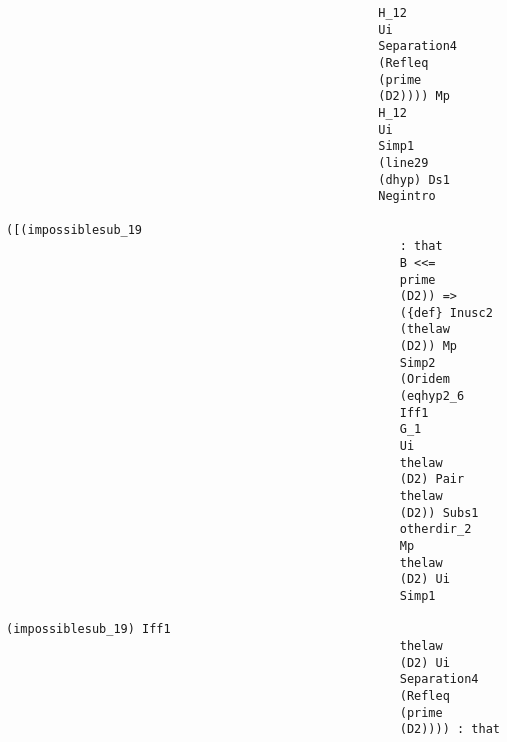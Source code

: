 \documentclass[12pt]{article}
\begin{document}
\begin{verbatim}
                                                    H_12 
                                                    Ui 
                                                    Separation4 
                                                    (Refleq 
                                                    (prime 
                                                    (D2)))) Mp 
                                                    H_12 
                                                    Ui 
                                                    Simp1 
                                                    (line29 
                                                    (dhyp) Ds1 
                                                    Negintro 
                                                    ([(impossiblesub_19 
                                                       : that 
                                                       B <<= 
                                                       prime 
                                                       (D2)) => 
                                                       ({def} Inusc2 
                                                       (thelaw 
                                                       (D2)) Mp 
                                                       Simp2 
                                                       (Oridem 
                                                       (eqhyp2_6 
                                                       Iff1 
                                                       G_1 
                                                       Ui 
                                                       thelaw 
                                                       (D2) Pair 
                                                       thelaw 
                                                       (D2)) Subs1 
                                                       otherdir_2 
                                                       Mp 
                                                       thelaw 
                                                       (D2) Ui 
                                                       Simp1 
                                                       (impossiblesub_19) Iff1 
                                                       thelaw 
                                                       (D2) Ui 
                                                       Separation4 
                                                       (Refleq 
                                                       (prime 
                                                       (D2)))) : that 

\end{verbatim}
\end{document}
